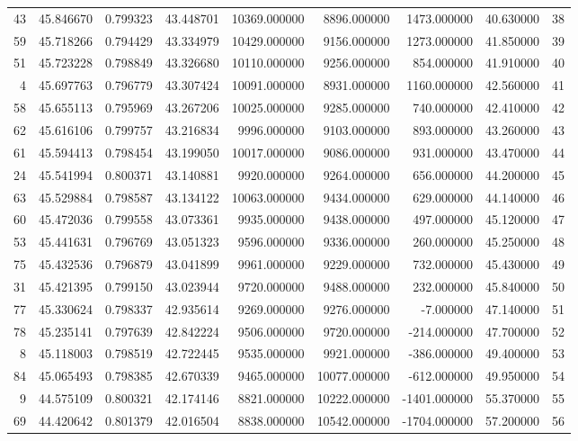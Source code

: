 \begin{tabular}{rrrrrrrrr}
43 & 45.846670 & 0.799323 & 43.448701 & 10369.000000 & 8896.000000 & 1473.000000 & 40.630000 & 38 \\
59 & 45.718266 & 0.794429 & 43.334979 & 10429.000000 & 9156.000000 & 1273.000000 & 41.850000 & 39 \\
51 & 45.723228 & 0.798849 & 43.326680 & 10110.000000 & 9256.000000 & 854.000000 & 41.910000 & 40 \\
4 & 45.697763 & 0.796779 & 43.307424 & 10091.000000 & 8931.000000 & 1160.000000 & 42.560000 & 41 \\
58 & 45.655113 & 0.795969 & 43.267206 & 10025.000000 & 9285.000000 & 740.000000 & 42.410000 & 42 \\
62 & 45.616106 & 0.799757 & 43.216834 & 9996.000000 & 9103.000000 & 893.000000 & 43.260000 & 43 \\
61 & 45.594413 & 0.798454 & 43.199050 & 10017.000000 & 9086.000000 & 931.000000 & 43.470000 & 44 \\
24 & 45.541994 & 0.800371 & 43.140881 & 9920.000000 & 9264.000000 & 656.000000 & 44.200000 & 45 \\
63 & 45.529884 & 0.798587 & 43.134122 & 10063.000000 & 9434.000000 & 629.000000 & 44.140000 & 46 \\
60 & 45.472036 & 0.799558 & 43.073361 & 9935.000000 & 9438.000000 & 497.000000 & 45.120000 & 47 \\
53 & 45.441631 & 0.796769 & 43.051323 & 9596.000000 & 9336.000000 & 260.000000 & 45.250000 & 48 \\
75 & 45.432536 & 0.796879 & 43.041899 & 9961.000000 & 9229.000000 & 732.000000 & 45.430000 & 49 \\
31 & 45.421395 & 0.799150 & 43.023944 & 9720.000000 & 9488.000000 & 232.000000 & 45.840000 & 50 \\
77 & 45.330624 & 0.798337 & 42.935614 & 9269.000000 & 9276.000000 & -7.000000 & 47.140000 & 51 \\
78 & 45.235141 & 0.797639 & 42.842224 & 9506.000000 & 9720.000000 & -214.000000 & 47.700000 & 52 \\
8 & 45.118003 & 0.798519 & 42.722445 & 9535.000000 & 9921.000000 & -386.000000 & 49.400000 & 53 \\
84 & 45.065493 & 0.798385 & 42.670339 & 9465.000000 & 10077.000000 & -612.000000 & 49.950000 & 54 \\
9 & 44.575109 & 0.800321 & 42.174146 & 8821.000000 & 10222.000000 & -1401.000000 & 55.370000 & 55 \\
69 & 44.420642 & 0.801379 & 42.016504 & 8838.000000 & 10542.000000 & -1704.000000 & 57.200000 & 56 \\

\end{tabular}
